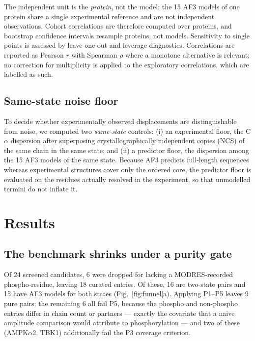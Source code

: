 The independent unit is the \emph{protein}, not the model: the 15 AF3
models of one protein share a single experimental reference and are not
independent observations. Cohort correlations are therefore computed over
proteins, and bootstrap confidence intervals resample proteins, not
models. Sensitivity to single points is assessed by leave-one-out and
leverage diagnostics. Correlations are reported as Pearson $r$ with
Spearman $\rho$ where a monotone alternative is relevant; no correction
for multiplicity is applied to the exploratory correlations, which are
labelled as such.

\subsection{Same-state noise floor}
\label{sec:noise}

To decide whether experimentally observed displacements are distinguishable
from noise, we computed two \emph{same-state} controls: (i) an
experimental floor, the C$\alpha$ dispersion after superposing
crystallographically independent copies (NCS) of the same chain in the same
state; and (ii) a predictor floor, the dispersion among the 15 AF3 models
of the same state. Because AF3 predicts full-length sequences whereas
experimental structures cover only the ordered core, the predictor floor
is evaluated on the residues actually resolved in the experiment, so that
unmodelled termini do not inflate it.

\section{Results}
\label{sec:results}

\subsection{The benchmark shrinks under a purity gate}
\label{sec:res-purity}



Of 24 screened candidates, 6 were dropped for lacking a
MODRES-recorded phospho-residue, leaving 18 curated entries. Of these, 16
are two-state pairs and 15 have AF3 models for both states
(Fig.~\ref{fig:funnel}a). Applying P1--P5 leaves 9 pure pairs; the remaining
6 all fail P5, because the phospho and non-phospho entries differ in chain
count or partners --- exactly the covariate that a naive amplitude
comparison would attribute to phosphorylation --- and two of these
(AMPK$\alpha$2, TBK1) additionally fail the P3 coverage criterion.

